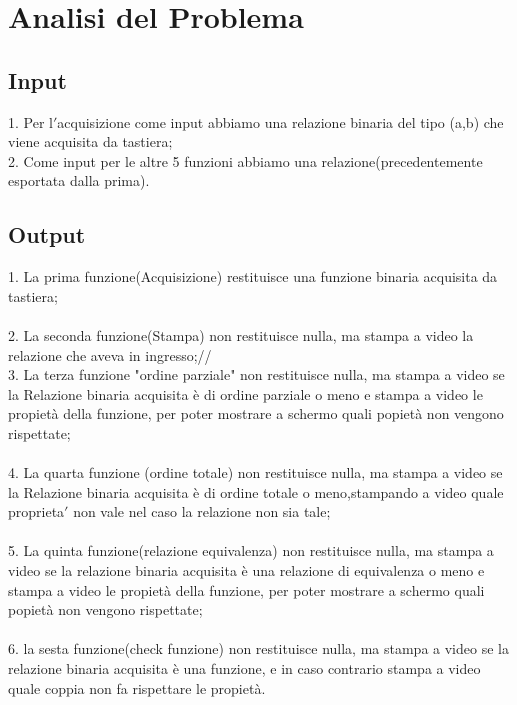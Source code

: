\documentclass[11pt, a4paper, titlepage, block]{article}
\begin{document}
	\section{Analisi del Problema}
	\subsection{Input}
	
	
	1. Per l$'$acquisizione come input abbiamo una relazione binaria del tipo (a,b) che viene   acquisita da tastiera;\\
	2. Come input per le altre 5 funzioni abbiamo una relazione(precedentemente esportata dalla prima).\\
	\subsection{Output}
	
	
	1. La prima funzione(Acquisizione) restituisce una funzione binaria acquisita da tastiera;\\
	\\
	2. La seconda funzione(Stampa) non restituisce nulla, ma stampa a video la relazione che aveva in ingresso;//
	\\
	3. La terza funzione "ordine parziale" non restituisce nulla, ma stampa a video se la Relazione binaria acquisita \`e di ordine parziale o meno e stampa a video le propiet\`a della funzione, per poter mostrare a schermo quali popiet\`a non vengono rispettate;\\
	\\
	4. La quarta funzione (ordine totale) non restituisce nulla, ma stampa a video se la Relazione binaria acquisita \`e di ordine totale o meno,stampando a video quale proprieta$'$  non vale nel caso la relazione non sia tale;\\
	\\
	5. La quinta funzione(relazione equivalenza) non restituisce nulla, ma stampa a video se la relazione binaria acquisita \`e una relazione di equivalenza o meno e stampa a video le propiet\`a della funzione, per poter mostrare a schermo quali popiet\`a non vengono rispettate;\\
	\\
	6. la sesta funzione(check funzione) non restituisce nulla, ma stampa a video se la relazione binaria acquisita \`e una funzione, e in caso contrario stampa a video quale coppia non fa rispettare le propiet\`a.\\
	
	
	
\end{document}
